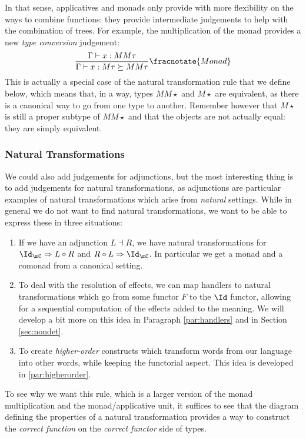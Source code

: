 \medskip

In that sense, applicatives and monads only provide with more flexibility on
the ways to combine functions:
they provide intermediate judgements to help with the combination of trees.
For example, the multiplication of the monad provides a new
\emph{type conversion} judgement:
\begin{equation*}
	\frac{\Gamma\vdash x: MM\tau}{\Gamma\vdash x: M\tau \succeq MM\tau}
	\fracnotate{Monad}
\end{equation*}
This is actually a special case of the natural transformation rule that we
define below, which means that, in a way, types $MM\star$ and $M\star$ are
equivalent, as there is a canonical way to go from one type to another.
Remember however that $M\star$ is still a proper subtype of $MM\star$ and that
the objects are not actually equal: they are simply equivalent.

\subsubsection{Natural Transformations}
\label{subsubsec:transnat}
We could also add judgements for adjunctions, but the most interesting thing is
to add judgements for natural transformations, as adjunctions are particular
examples of natural transformations which arise from \emph{natural} settings.
While in general we do not want to find natural transformations, we want to be
able to express these in three situations:
\begin{enumerate}
	\item If we have an adjunction $L\dashv R$, we have natural transformations
	      for $\Id_{\mC} \Rightarrow L \circ R$ and $R\circ L \Rightarrow \Id_{\mC}$.
	      In particular we get a monad and a comonad from a canonical setting.
	\item To deal with the resolution of effects, we can map handlers to natural
	      transformations which go from some functor $F$ to the $\Id$ functor,
	      allowing for a sequential computation of the effects added to the meaning.
	      We will develop a bit more on this idea in Paragraph \ref{par:handlers}
	      and in Section \ref{sec:nondet}.
	\item To create \emph{higher-order} constructs which transform words from our
	      language into other words, while keeping the functorial aspect.
	      This idea is developed in \ref{par:higherorder}.
\end{enumerate}

To see why we want this rule, which is a larger version of the monad
multiplication and the monad/applicative unit, it suffices to see that the
diagram defining the properties of a natural transformation provides a way
to construct the \emph{correct function} on the \emph{correct functor} side of
types.

